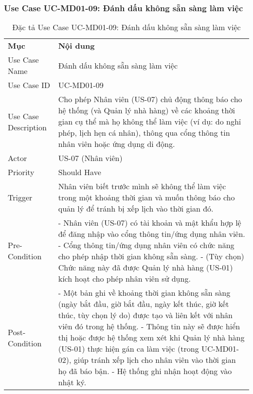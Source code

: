 \subsubsection{Use Case UC-MD01-09: Đánh dấu không sẵn sàng làm việc}
\begin{longtable}{|m{4cm}|p{11cm}|}
\caption{Đặc tả Use Case UC-MD01-09: Đánh dấu không sẵn sàng làm việc} \label{tab:uc_md01_09} \\
\hline

\endhead %

\hline
\endfoot %

\hline
\endlastfoot %
\multicolumn{2}{|c|}{\textbf{2.1. Tóm tắt (Summary)}} \\
\hline
\textbf{Mục} & \textbf{Nội dung} \\
\hline
Use Case Name & Đánh dấu không sẵn sàng làm việc \\
\hline
Use Case ID & UC-MD01-09 \\
\hline
Use Case Description & Cho phép Nhân viên (US-07) chủ động thông báo cho hệ thống (và Quản lý nhà hàng) về các khoảng thời gian cụ thể mà họ không thể làm việc (ví dụ: do nghỉ phép, lịch hẹn cá nhân), thông qua cổng thông tin nhân viên hoặc ứng dụng di động. \\
\hline
Actor & US-07 (Nhân viên) \\
\hline
Priority & Should Have \\
\hline
Trigger & Nhân viên biết trước mình sẽ không thể làm việc trong một khoảng thời gian và muốn thông báo cho quản lý để tránh bị xếp lịch vào thời gian đó. \\
\hline
Pre-Condition & - Nhân viên (US-07) có tài khoản và mật khẩu hợp lệ để đăng nhập vào cổng thông tin/ứng dụng nhân viên. \newline - Cổng thông tin/ứng dụng nhân viên có chức năng cho phép nhập thời gian không sẵn sàng. \newline - (Tùy chọn) Chức năng này đã được Quản lý nhà hàng (US-01) kích hoạt cho phép nhân viên sử dụng. \\
\hline
Post-Condition & - Một bản ghi về khoảng thời gian không sẵn sàng (ngày bắt đầu, giờ bắt đầu, ngày kết thúc, giờ kết thúc, tùy chọn lý do) được tạo và liên kết với nhân viên đó trong hệ thống. \newline - Thông tin này sẽ được hiển thị hoặc được hệ thống xem xét khi Quản lý nhà hàng (US-01) thực hiện gán ca làm việc (trong UC-MD01-02), giúp tránh xếp lịch cho nhân viên vào thời gian họ đã báo bận. \newline - Hệ thống ghi nhận hoạt động vào nhật ký. \\

\end{longtable}
